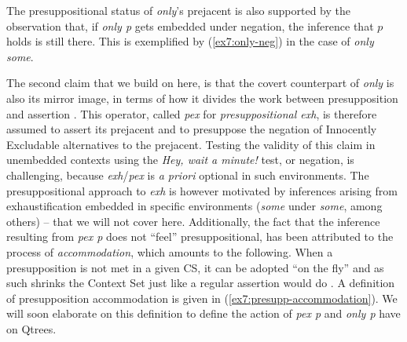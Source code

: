 \begin{exe}
	\label{ex7:only-hwam}
\end{exe}

The presuppositional status of \textit{only}'s prejacent is also supported by the observation that, if \textit{only p} gets embedded under negation, the inference that $p$ holds is still there. This is exemplified by (\ref{ex7:only-neg}) in the case of \textit{only some}.

\begin{exe}
	\label{ex7:only-neg}
\end{exe}


The second claim that we build on here, is that the covert counterpart of \textit{only} is also its mirror image, in terms of how it divides the work between presupposition and assertion \parencite{Bassi2021,DelPinal2024}. This operator, called \textit{pex} for \textit{presuppositional exh}, is therefore assumed to assert its prejacent and to presuppose the negation of Innocently Excludable alternatives to the prejacent. Testing the validity of this claim in unembedded contexts using the \textit{Hey, wait a minute!} test, or negation, is challenging, because \textit{exh}/\textit{pex} is \textit{a priori} optional in such environments. The presuppositional approach to \textit{exh} is however motivated by inferences arising from exhaustification embedded in specific environments (\textit{some} under \textit{some}, among others) -- that we will not cover here. Additionally, the fact that the inference resulting from \textit{pex p} does not ``feel'' presuppositional, has been attributed to the process of \textit{accommodation}, which amounts to the following. When a presupposition is not met in a given CS, it can be adopted ``on the fly'' and as such shrinks the Context Set just like a regular assertion would do \parencite{Stalnaker1974,Stalnaker2002,vonFintel2008}. A definition of presupposition accommodation is given in (\ref{ex7:presupp-accommodation}). We will soon elaborate on this definition to define the action of \textit{pex p} and \textit{only p} have on Qtrees.

\begin{exe}
	\label{ex7:presupp-accommodation}
\end{exe}
	
